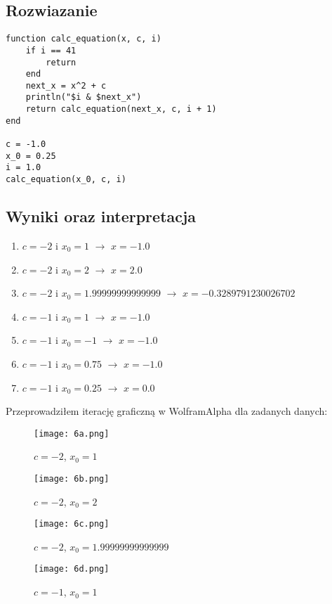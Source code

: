 \documentclass{article}
\begin{document}
\subsection{Rozwiazanie}
\begin{verbatim}
function calc_equation(x, c, i)
    if i == 41
        return
    end
    next_x = x^2 + c
    println("$i & $next_x")
    return calc_equation(next_x, c, i + 1)
end

c = -1.0
x_0 = 0.25
i = 1.0
calc_equation(x_0, c, i)
\end{verbatim}
\subsection{Wyniki oraz interpretacja}
\begin{enumerate}
    \item $c =-2$ i $x_0 = 1$ $\rightarrow$ $x = -1.0$
    \item $c =-2$ i $x_0 = 2$ $\rightarrow$ $x = 2.0$
    \item $c =-2$ i $x_0 = 1.99999999999999$ $\rightarrow$ $x = -0.3289791230026702$
    \item $c =-1$ i $x_0 = 1$ $\rightarrow$ $x = -1.0$
    \item $c =-1$ i $x_0 = -1$ $\rightarrow$ $x = -1.0$
    \item $c =-1$ i $x_0 = 0.75$ $\rightarrow$ $x = -1.0$
    \item $c =-1$ i $x_0 = 0.25$ $\rightarrow$ $x = 0.0$
\end{enumerate}
Przeprowadziłem iterację graficzną w WolframAlpha dla zadanych danych:

\begin{figure}[H] 
\centering
\texttt{[image: 6a.png]}
\caption{$c = -2$, $x_0 = 1$}
\label{Fig_}
\end{figure}

\begin{figure}[H] 
\centering
\texttt{[image: 6b.png]}
\caption{$c = -2$, $x_0 = 2$}
\end{figure}

\begin{figure}[H] 
\centering
\texttt{[image: 6c.png]}
\caption{$c = -2$, $x_0 = 1.99999999999999$}
\end{figure}

\begin{figure}[H] 
\centering
\texttt{[image: 6d.png]}
\caption{$c = -1$, $x_0 = 1$}
\end{figure}
\end{document}
